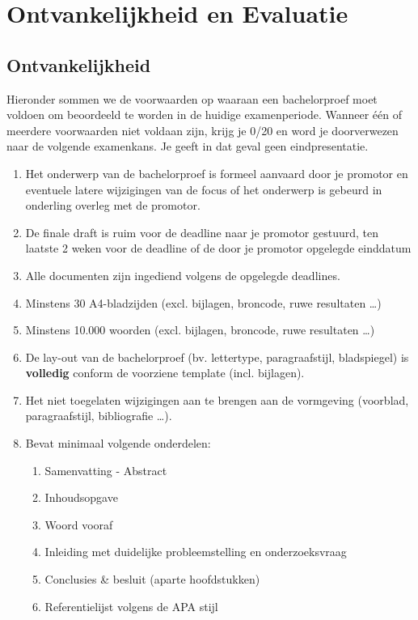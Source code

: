 \chapter{Ontvankelijkheid en Evaluatie}
\section{Ontvankelijkheid}
Hieronder sommen we de voorwaarden op waaraan een bachelorproef moet voldoen om beoordeeld te worden in de huidige examenperiode. Wanneer één of meerdere voorwaarden niet voldaan zijn, krijg je 0/20 en word je doorverwezen naar de volgende examenkans. Je geeft in dat geval geen eindpresentatie.

\begin{enumerate}
	\item Het onderwerp van de bachelorproef is formeel aanvaard door je promotor en eventuele latere wijzigingen van de focus of het onderwerp is gebeurd in onderling overleg met de promotor.
	\item De finale draft is ruim voor de deadline naar je promotor gestuurd, ten laatste 2 weken voor de deadline of de door je promotor opgelegde einddatum
	\item Alle documenten zijn ingediend volgens de opgelegde deadlines. 
	\item Minstens 30 A4-bladzijden (excl. bijlagen, broncode, ruwe resultaten \dots)
	\item Minstens 10.000 woorden (excl. bijlagen, broncode, ruwe resultaten \dots)
	\item De lay-out van de bachelorproef (bv. lettertype, paragraafstijl, bladspiegel) is \textbf{volledig } conform de voorziene template (incl. bijlagen).
	\item Het niet toegelaten wijzigingen aan te brengen aan de vormgeving (voorblad, paragraafstijl, bibliografie \dots ).
	\item Bevat minimaal volgende onderdelen:
	 \begin{enumerate}
	 	\item Samenvatting - Abstract
	 	\item Inhoudsopgave 	
	 	\item Woord vooraf
	 	\item Inleiding met duidelijke probleemstelling en onderzoeksvraag
	 	\item Conclusies \& besluit (aparte hoofdstukken)
	 	\item Referentielijst volgens de APA stijl
	 \end{enumerate}

\end{enumerate}
